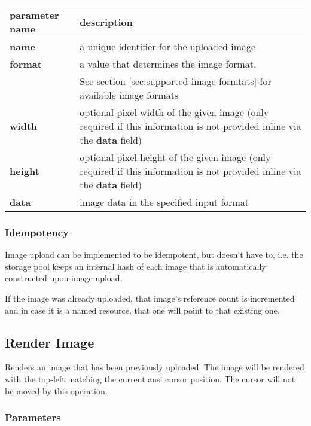 \documentclass[a4paper]{article}
\begin{document}
\begin{tabular}{|m{3cm}|m{12cm}|}
  \hline
  \textbf{parameter name} & \textbf{description} \\
  \hline
  \textbf{name}           & a unique identifier for the uploaded image \\
  \textbf{format}         & a value that determines the image format. \\
                          & See section \ref{sec:supported-image-formtats} for available image formats \\
  \textbf{width}          & optional pixel width of the given image
                            (only required if this information is not provided
                            inline via the \textbf{data} field) \\
  \textbf{height}         & optional pixel height of the given image
                            (only required if this information is not provided
                            inline via the \textbf{data} field) \\
  \textbf{data}           & image data in the specified input format \\
  \hline
\end{tabular}

\subsubsection{Idempotency}

Image upload can be implemented to be idempotent, but doesn't have to,
i.e. the storage pool keeps an internal hash of each image that is
automatically constructed upon image upload.

If the image was already uploaded, that image's reference count is incremented
and in case it is a named resource, that one will point to that existing one.

\subsection{Render Image} %

Renders an image that has been previously uploaded.
The image will be rendered with the top-left matching the current ansi cursor position.
The cursor will not be moved by this operation.

\subsubsection*{Parameters}
\end{document}

